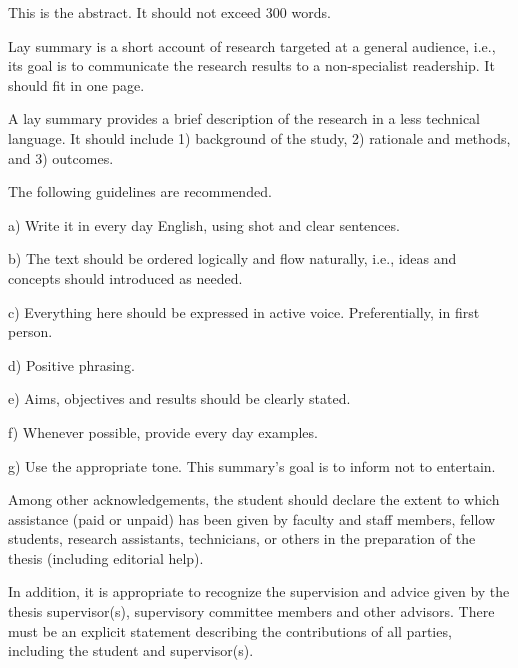 %
\begin{prefatory}
\frontpage
\abstract%
This is the abstract. It should not exceed $300$ words.
\dedication%
{\flushright
To whom you what to dedicate this work
}
\laysummary %
Lay summary is a short account of research targeted at a general
audience, i.e., its goal is to communicate the research results to a
non-specialist readership. It should fit in one page. 

A lay summary provides a brief description of the research in a less
technical language. It should include 1) background of the study, 2)
rationale and methods, and 3) outcomes. 

The following guidelines are recommended. 

a) Write it in every day English, using shot and clear sentences. 

b) The text should be ordered logically and flow naturally, i.e.,
ideas and concepts should introduced as needed. 

c) Everything here should be expressed in active
voice. Preferentially, in first person. 

d) Positive phrasing. 

e) Aims, objectives and results should be clearly stated. 

f) Whenever possible, provide every day examples. 

g) Use the appropriate tone. This summary's goal is to inform not to
entertain.

\acknowledgements%
Among other acknowledgements, the student should declare the
extent to which assistance (paid or unpaid) has been given by faculty
and staff members, fellow students, research assistants, technicians,
or others in the preparation of the thesis (including editorial help).

\noindent
In addition, it is appropriate to recognize the supervision and advice
given by the thesis supervisor(s), supervisory committee members and
other advisors.
\contribution%
There must be an explicit statement describing the contributions of all
parties, including the student and supervisor(s).


\end{prefatory}
